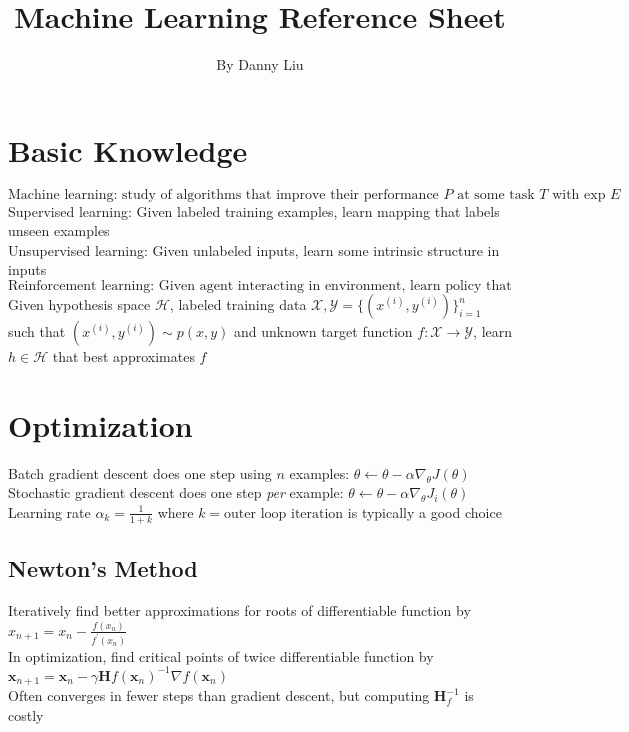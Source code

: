 \documentclass{article}
\title{Machine Learning Reference Sheet}
\author{By Danny Liu}
\date{}
\begin{document}
\maketitle

\section{Basic Knowledge}
$\mbox{Machine learning: study of algorithms that improve their performance }P\mbox{ at some task }T\mbox{ with exp }E$ \\
Supervised learning: Given labeled training examples, learn mapping that labels unseen examples \\
Unsupervised learning: Given unlabeled inputs, learn some intrinsic structure in inputs \\
$\mbox{Reinforcement learning: Given agent interacting in environment, learn policy that maximizes reward}$ \\
Given hypothesis space $\mathcal{H}$, labeled training data $\mathcal{X}, \mathcal{Y} = \{(x^{(i)}, y^{(i)})\}_{i=1}^n$ such that $(x^{(i)}, y^{(i)}) \sim p(x,y)$ and unknown target function $f: \mathcal{X} \to \mathcal{Y}$, learn $h \in \mathcal{H}$ that best approximates $f$

\section{Optimization}
Batch gradient descent does one step using $n$ examples: $ \theta \leftarrow \theta - \alpha \nabla_\theta J(\theta)$ \\
Stochastic gradient descent does one step \textit{per} example: $\theta \leftarrow \theta - \alpha \nabla_\theta J_i(\theta)$ \\
Learning rate $\alpha_k = \frac{1}{1+k}$ where $k = \mbox{outer loop iteration}$ is typically a good choice
\subsection{Newton's Method}
Iteratively find better approximations for roots of differentiable function by $x_{n+1} = x_n - \frac{f(x_n)}{f^\prime(x_n)}$ \\
In optimization, find critical points of twice differentiable function by $\boldsymbol{x}_{n+1} = \boldsymbol{x}_n - \gamma \boldsymbol{H}f(\boldsymbol{x}_n)^{-1} \nabla f(\boldsymbol{x}_n) $ \\
Often converges in fewer steps than gradient descent, but computing $\boldsymbol{H}_f^{-1}$ is costly 
\end{document}
